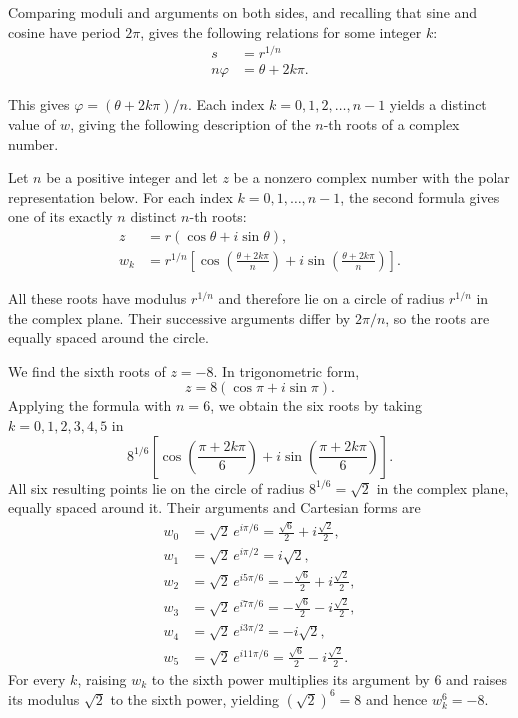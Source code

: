 Comparing moduli and arguments on both sides, and recalling that sine and cosine have period $2\pi$, gives the following relations for some integer $k$:
\[
\begin{aligned}
s &= r^{1/n} \\
n\varphi &= \theta + 2k\pi.
\end{aligned}
\]

This gives $\varphi = (\theta + 2k\pi)/n$. Each index $k = 0, 1, 2, \dots, n-1$ yields a distinct value of $w$, giving the following description of the $n$-th roots of a complex number.

\begin{theorem}
Let $n$ be a positive integer and let $z$ be a nonzero complex number with the polar representation below. For each index $k = 0, 1, \dots, n-1$, the second formula gives one of its exactly $n$ distinct $n$-th roots:
\[
\begin{aligned}
z &= r(\cos\theta + i\sin\theta), \\
w_k &= r^{1/n} \left[ \cos\left( \frac{\theta + 2k\pi}{n} \right) + i \sin\left( \frac{\theta+2k\pi}{n} \right) \right].
\end{aligned}
\]

\end{theorem}

All these roots have modulus $r^{1/n}$ and therefore lie on a circle of radius $r^{1/n}$ in the complex plane.
Their successive arguments differ by $2\pi/n$, so the roots are equally spaced around the circle.

\begin{example}
We find the sixth roots of $z = -8$. In trigonometric form,
\[
z = 8(\cos\pi + i\sin\pi).
\]
Applying the formula with $n = 6$, we obtain the six roots by taking $k = 0, 1, 2, 3, 4, 5$ in
\[
8^{1/6} \left[ \cos\left( \frac{\pi + 2k\pi}{6} \right) + i \sin\left( \frac{\pi+2k\pi}{6} \right) \right].
\]
All six resulting points lie on the circle of radius $8^{1/6} = \sqrt{2}$ in the complex plane, equally spaced around it.
Their arguments and Cartesian forms are
\[
\begin{aligned}
w_0&=\sqrt2\,e^{i\pi/6}
=\frac{\sqrt6}{2}+i\frac{\sqrt2}{2},\\
w_1&=\sqrt2\,e^{i\pi/2}=i\sqrt2,\\
w_2&=\sqrt2\,e^{i5\pi/6}
=-\frac{\sqrt6}{2}+i\frac{\sqrt2}{2},\\
w_3&=\sqrt2\,e^{i7\pi/6}
=-\frac{\sqrt6}{2}-i\frac{\sqrt2}{2},\\
w_4&=\sqrt2\,e^{i3\pi/2}=-i\sqrt2,\\
w_5&=\sqrt2\,e^{i11\pi/6}
=\frac{\sqrt6}{2}-i\frac{\sqrt2}{2}.
\end{aligned}
\]
For every $k$, raising $w_k$ to the sixth power multiplies its argument
by $6$ and raises its modulus $\sqrt{2}$ to the sixth power, yielding
$(\sqrt{2})^6=8$ and hence $w_k^6=-8$.
\end{example}

